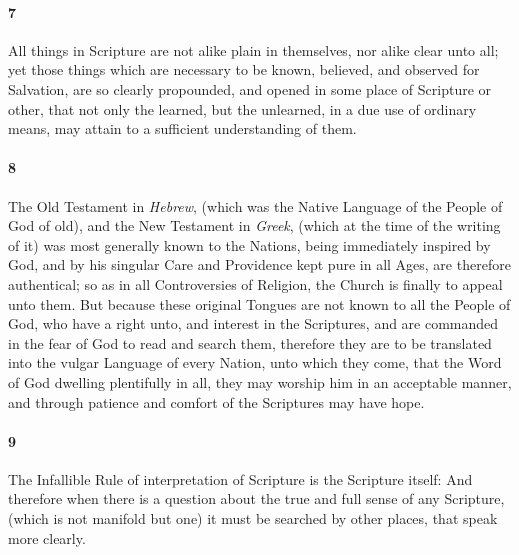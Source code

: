 \documentclass[
    paper=letterpaper,
    11pt,
    twoside,
    DIV=calc,
    openany
]{scrbook}
\begin{document}
\footnotebegin
{}
\footnoteend

\paragraph{7} %
All things in Scripture are not alike \R{}plain in themselves, nor alike clear unto all; yet those things which are necessary to be known, believed, and observed for Salvation, are so \R{}clearly propounded, and opened in some place of Scripture or other, that not only the learned, but the unlearned, in a due use of ordinary means, may attain to a sufficient understanding of them.

\footnotebegin
{}
\footnoteend

\paragraph{8} %
The Old Testament in \R{}\textit{Hebrew}, (which was the Native Language of the People of God of old), and the New Testament in \textit{Greek}, (which at the time of the writing of it) was most generally known to the Nations, being immediately inspired by God, and by his singular Care and Providence kept pure in all Ages, are therefore \R{}authentical; so as in all Controversies of Religion, the Church is finally to appeal unto them. \R{}But because these original Tongues are not known to all the People of God, who have a right unto, and interest in the Scriptures, and are commanded in the fear of God to read \R{}and search them, therefore they are to be translated into the vulgar Language of every Nation, unto which they \R{}come, that the Word of God dwelling \R{}plentifully in all, they may worship him in an acceptable manner, and through patience and comfort of the Scriptures may have hope.

\footnotebegin
{}
\footnoteend

\paragraph{9} %
The Infallible Rule of interpretation of Scripture is the \R{}Scripture itself: And therefore when there is a question about the true and full sense of any Scripture, (which is not manifold but one) it must be searched by other places, that speak more clearly.
\end{document}
